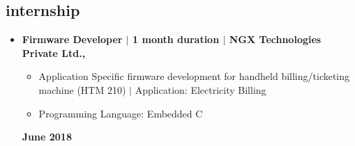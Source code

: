 \documentclass[margin,line]{res}
\begin{document}
\begin{resume}
		\section{\sc internship}

			\begin{itemize}
				\item \textbf{Firmware Developer $\vert$ 1 month duration $\vert$ NGX Technologies Private Ltd.,}  \newline
					\begin{itemize}
						\item Application Specific firmware development for handheld billing/ticketing machine (HTM 210) $\vert$ Application: Electricity Billing
						\item Programming Language: Embedded C
					\end{itemize}
				\null \hfill \textbf{June 2018} \newline	
			\end{itemize}




\end{resume}
\end{document}
